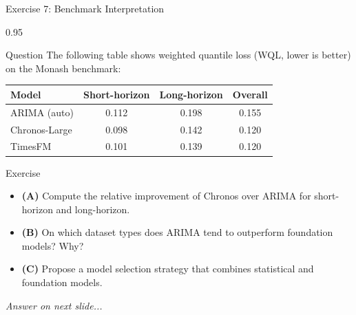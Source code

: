 \documentclass[9pt, aspectratio=169, t]{beamer}
\begin{document}
\begin{frame}{Exercise 7: Benchmark Interpretation}
    \begin{cminipage}{0.95\textwidth}
    {\small
    \begin{alertblock}{Question}
        The following table shows weighted quantile loss (WQL, lower is better) on the Monash benchmark:
        \begin{center}
        {\footnotesize
        \begin{tabular}{lccc}
            \toprule
            \textbf{Model} & \textbf{Short-horizon} & \textbf{Long-horizon} & \textbf{Overall} \\
            \midrule
            ARIMA (auto) & 0.112 & 0.198 & 0.155 \\
            Chronos-Large & 0.098 & 0.142 & 0.120 \\
            TimesFM & 0.101 & 0.139 & 0.120 \\
            \bottomrule
        \end{tabular}
        }
        \end{center}
    \end{alertblock}

    \vspace{0.1cm}

    \begin{block}{Exercise}
        \begin{itemize}\setlength{\itemsep}{3pt}
            \item \textcolor{MainBlue}{\textbf{(A)}} Compute the relative improvement of Chronos over ARIMA for short-horizon and long-horizon.
            \item \textcolor{MainBlue}{\textbf{(B)}} On which dataset types does ARIMA tend to outperform foundation models? Why?
            \item \textcolor{MainBlue}{\textbf{(C)}} Propose a model selection strategy that combines statistical and foundation models.
        \end{itemize}
    \end{block}

    \vspace{0.1cm}

    \begin{center}
        \textit{Answer on next slide...}
    \end{center}
    }
    \end{cminipage}
\end{frame}
\end{document}
